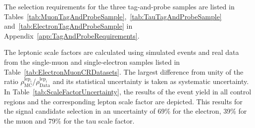 The selection requirements for the three tag-and-probe samples are listed in Tables~\ref{tab:MuonTagAndProbeSample},~\ref{tab:TauTagAndProbeSample} and~\ref{tab:ElectronTagAndProbeSample} in Appendix~\ref{app:TagAndProbeRequirements}.

The leptonic scale factors are calculated using simulated \Zlep events and real data from the single-muon and single-electron samples listed in Table~\ref{tab:ElectronMuonCRDatasets}.
The largest difference from unity of the ratio $\rho^{\text{lep}_i}_{\text{MC}}$/$\rho^{\text{lep}_i}_{\text{Data}}$ and its statistical uncertainty is taken as systematic uncertainty. 
In Table~\ref{tab:ScaleFactorUncertainty}, the results of the event yield in all control regions and the corresponding lepton scale factor are depicted.
This results for the signal candidate selection in an uncertainty of 69\% for the electron, 39\% for the muon and 79\% for the tau scale factor.

